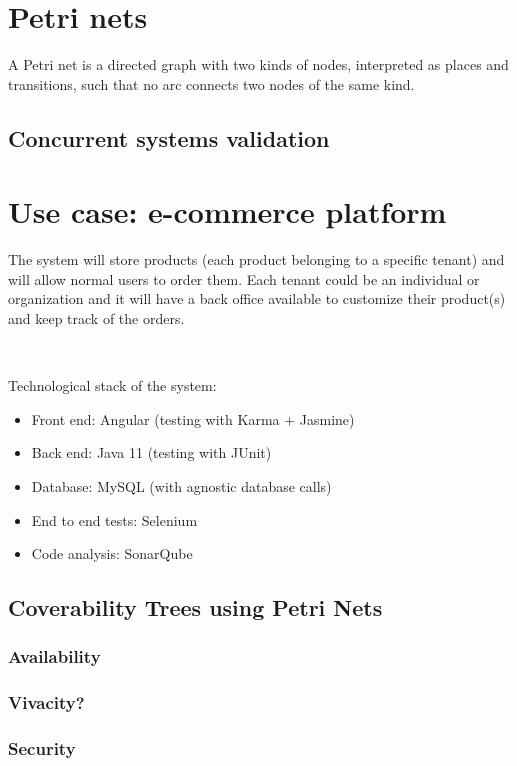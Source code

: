 \documentclass[11pt,english]{article} %
\begin{document}
\section{Petri nets}
A Petri net is a directed graph with two kinds of nodes,
interpreted as places and transitions,
such that no arc connects two nodes of the same kind.


\subsection{Concurrent systems validation}





\section{Use case: e-commerce platform}
The system will store products (each product belonging to a specific tenant) and will allow normal users to order them. Each tenant could be an individual or organization and it will have a back office available to customize their product(s) and keep track of the orders.

\

Technological stack of the system:
\begin{itemize}
    \item Front end: Angular (testing with Karma + Jasmine)
    \item Back end: Java 11 (testing with JUnit)
    \item Database: MySQL (with agnostic database calls)
    \item End to end tests: Selenium
    \item Code analysis: SonarQube
\end{itemize}


\subsection{Coverability Trees using Petri Nets}
\subsubsection{Availability}
\subsubsection{Vivacity?}
\subsubsection{Security}


\newpage
\printbibliography
\end{document}
